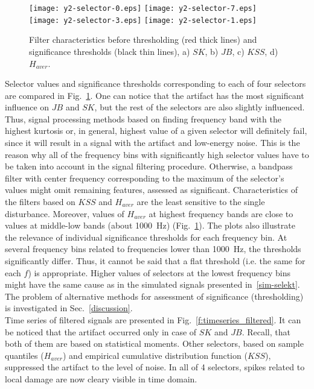 \documentclass[11pt]{article} %
\begin{document}
\begin{figure}[!ht]
\begin{center}
\texttt{[image: y2-selector-0.eps]}
\texttt{[image: y2-selector-7.eps]}
\texttt{[image: y2-selector-3.eps]}
\texttt{[image: y2-selector-1.eps]}
\caption{Filter characteristics before thresholding (red thick lines) and significance thresholds (black thin lines), a) $SK$, b) $JB$, c) $KSS$, d) $H_{aver}$.\label{f:selectors}}
\end{center}
\end{figure}
Selector values and significance thresholds corresponding to each of four selectors are compared in Fig.~\ref{f:selectors}. One can notice that the artifact has the most significant influence on $JB$ and $SK$, but the rest of the selectors are also slightly influenced. Thus, signal processing methods based on finding frequency band with the highest kurtosis or, in general, highest value of a given selector will definitely fail, since it will result in a signal with the artifact and low-energy noise. This is the reason why all of the frequency bins with significantly high selector values have to be taken into account in the signal filtering procedure. Otherwise, a bandpass filter with center frequency corresponding to the maximum of the selector's values might omit remaining features, assessed as significant. Characteristics of the filters based on $KSS$ and $H_{aver}$ are the least sensitive to the single disturbance. Moreover, values of $H_{aver}$ at highest frequency bands are close to values at middle-low bands (about 1000~Hz) (Fig.~\ref{f:selectors}). The plots also illustrate the relevance of individual significance thresholds for each frequency bin.  At several frequency bins related to frequencies lower than 1000~Hz, the thresholds significantly differ. Thus, it cannot be said that a flat threshold (i.e. the same for each $f$) is appropriate. Higher values of selectors at the lowest frequency bins might have the same cause as in the simulated signals presented in~\ref{sim-selekt}. The problem of alternative methods for assessment of significance (thresholding) is investigated in Sec.~\ref{discussion}.\\
Time series of filtered signals are presented in Fig.~\ref{f:timeseries_filtered}. It can be noticed that the artifact occurred only in case of $SK$ and $JB$. Recall, that both of them are based on statistical moments. Other selectors, based on sample quantiles ($H_{aver}$) and empirical cumulative distribution function ($KSS$), suppressed the artifact to the level of noise. In all of 4 selectors, spikes related to local damage are now cleary visible in time domain.\\
\end{document}

